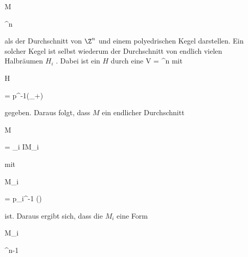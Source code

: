 {\mavergleichskette

{\vergleichskette

{M
}

{ \subseteq }{ \Z^n
}

{  }{
}

{    }{
}

{   }{
}

}
{}{}{}
als der Durchschnitt
 {} {}
von $\Z^n$ und einem polyedrischen Kegel darstellen. Ein solcher Kegel ist selbst wiederum der Durchschnitt von endlich vielen Halbräumen $H_i$
 {} {.}
Dabei ist ein
$H$ durch eine
 { V = \R^n  } {\R
} {}
mit


\mavergleichskette

{\vergleichskette

{H
}

{ = }{ p^{-1}(\R_+)
}

{  }{
}

{    }{
}

{   }{
}

}
{}{}{}
gegeben. Daraus folgt, dass $M$ ein endlicher Durchschnitt


\mavergleichskette

{\vergleichskette

{M
}

{ = }{ \bigcap_{i \in I}M_i
}

{  }{
}

{    }{
}

{   }{
}

}
{}{}{}
mit


\mavergleichskette

{\vergleichskette

{ M_i
}

{ = }{ p_i^{-1} (\N)
}

{  }{
}

{    }{
}

{   }{
}

}
{}{}{}
ist. Daraus ergibt sich, dass die $M_i$ eine Form


\mavergleichskette

{\vergleichskette

{ M_i
}

{ \cong }{ \N \times \Z^{n-1}
}

{  }{
}

{    }{
}

{   }{
}

}}
